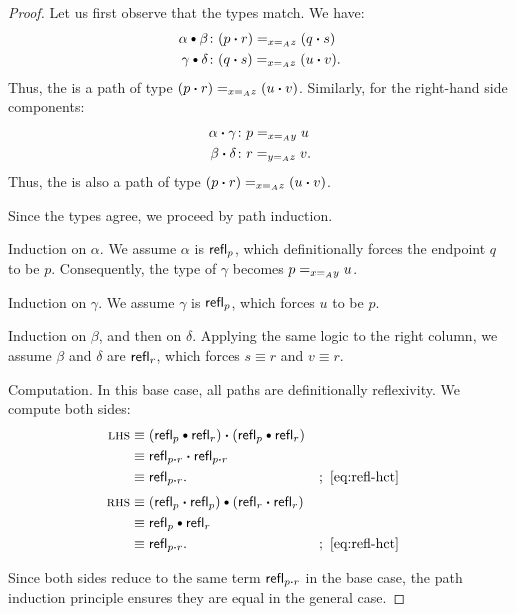 \begin{proof}
    Let us first observe that the types match. We have:
    \begin{align*}
        \alpha\hct\beta &\colon (p\ct r)\eq{x\eq Az}(q\ct s)\\
        \gamma\hct\delta &\colon (q\ct s)\eq{x\eq Az}(u\ct v).
    \end{align*}
    Thus, the \lhs is a path of type $(p\mathbin{\boldsymbol{\cdot}} r)\mathrel{=_{x\mathrel{=_{A}}z}}(u\mathbin{\boldsymbol{\cdot}} v)$.
    Similarly, for the right-hand side components:
    \begin{align*}
        \alpha\ct\gamma &\colon p\eq{x\eq Ay}u\\
        \beta\ct\delta &\colon r\eq{y\eq Az}v.
    \end{align*}
    Thus, the \rhs is also a path of type $(p\mathbin{\boldsymbol{\cdot}} r)\mathrel{=_{x\mathrel{=_{A}}z}}(u\mathbin{\boldsymbol{\cdot}} v)$.
    
    Since the types agree, we proceed by path induction.
    \begin{description}[font=\normalfont\scshape]
        \item[Step 1.] Induction on $\alpha$. We assume $\alpha$ is $\mathsf{refl}_p$, which definitionally forces the endpoint $q$ to be $p$. Consequently, the type of $\gamma$ becomes $p\mathrel{=_{x\mathrel{=_{A}}y}}u$.

        \item[Step 2.] Induction on $\gamma$. We assume $\gamma$ is $\mathsf{refl}_p$, which forces $u$ to be $p$.

        \item[Step 3.] Induction on $\beta$, and then on $\delta$. Applying the same logic to the right column, we assume $\beta$ and $\delta$ are $\mathsf{refl}_r$, which forces $s \equiv r$ and $v \equiv r$.
        
        \item[Step 4.] Computation. In this base case, all paths are definitionally reflexivity. We compute both sides:
        \begin{align*}
            \lhs&\equiv(\fun{refl}_p\hct\fun{refl}_r)
                \ct(\fun{refl}_p\hct\fun{refl}_r)\\
                    &\equiv\fun{refl}_{p\ct r}
                        \ct \fun{refl}_{p\ct r}\\
                    &\equiv\fun{refl}_{p\ct r}.
                        &&;\ \eqref{eq:refl-hct}\\[1mm]
            \rhs&\equiv(\fun{refl}_p\ct\fun{refl}_p)
                \hct(\fun{refl}_r\ct\fun{refl}_r)\\
                    &\equiv\fun{refl}_p\hct\fun{refl}_r\\
                    &\equiv\fun{refl}_{p\ct r}.
                        &&;\ \eqref{eq:refl-hct}
        \end{align*}
    \end{description}
    Since both sides reduce to the same term $\mathsf{refl}_{p\mathbin{\boldsymbol{\cdot}} r}$ in the base case, the path induction principle ensures they are equal in the general case.
\end{proof}

